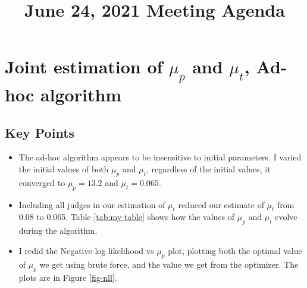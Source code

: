 \documentclass[11pt]{article}
\title{June 24, 2021 Meeting Agenda}
\begin{document}
\maketitle

\section{Joint estimation of $\mu_p$ and $\mu_t$, Ad-hoc algorithm}
  \subsection{Key Points}
    \begin{itemize}
      \item The ad-hoc algorithm appears to be insensitive to initial parameters. I varied the initial values of both $\mu_p$ and $\mu_t$, regardless of the initial values, it converged to $\mu_p=13.2$ and $\mu_t=0.065$.
      \item Including all judges in our estimation of $\mu_t$ reduced our estimate of $\mu_t$ from 0.08 to 0.065. Table \ref{tab:my-table} shows how the values of $\mu_p$ and $\mu_t$ evolve during the algorithm.
      \item I redid the Negative log likelihood vs $\mu_p$ plot, plotting both the optimal value of $\mu_p$ we get using brute force, and the value we get from the optimizer. The plots are in Figure \ref{fig-nll}.

    \end{itemize}
\end{document}
